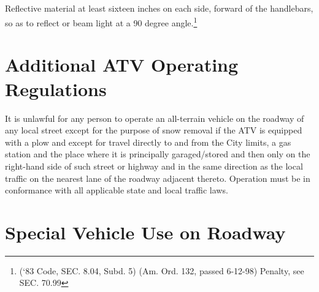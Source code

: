 \subsection{}
Reflective material at least sixteen inches on each side, forward of the handlebars, so as to reflect or beam light at a 90 degree angle.\footnote{(‘83 Code, SEC. 8.04, Subd. 5) (Am. Ord. 132, passed 6-12-98) Penalty, see SEC. 70.99}

\section{Additional ATV Operating Regulations}
It is unlawful for any person to operate an all-terrain vehicle on the roadway of any local street except for the purpose of snow removal if the ATV is equipped with a plow and except for travel directly to and from the City limits, a gas station and the place where it is principally garaged/stored and then only on the right-hand side of such street or highway and in the same direction as the local traffic on the nearest lane of the roadway adjacent thereto. Operation must be in conformance with all applicable state and local traffic laws.\\


\setcounter{section}{29}
\section{Special Vehicle Use on Roadway}
